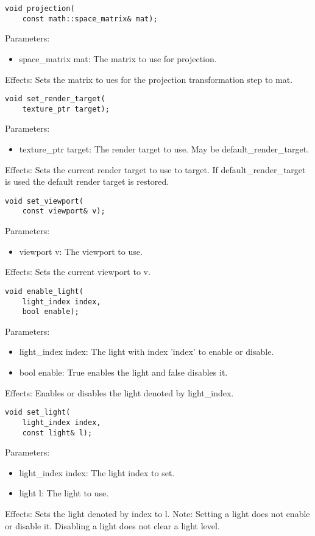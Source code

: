 \documentclass{article}
\begin{document}
\begin{lstlisting}
void projection(
	const math::space_matrix& mat);
\end{lstlisting}
Parameters:
\begin{itemize}
\item space\_matrix mat: The matrix to use for projection.
\end{itemize}
Effects: Sets the matrix to ues for the projection transformation step to mat.

\begin{lstlisting}
void set_render_target(
	texture_ptr target);
\end{lstlisting}
Parameters:
\begin{itemize}
\item texture\_ptr target: The render target to use. May be default\_render\_target.
\end{itemize}
Effects: Sets the current render target to use to target. If default\_render\_target is used the default render target is restored.

\begin{lstlisting}
void set_viewport(
	const viewport& v);
\end{lstlisting}
Parameters:
\begin{itemize}
\item viewport v: The viewport to use.
\end{itemize}
Effects: Sets the current viewport to v.

\begin{lstlisting}
void enable_light(
	light_index index,
	bool enable);
\end{lstlisting}
Parameters:
\begin{itemize}
\item light\_index index: The light with index 'index' to enable or disable.
\item bool enable: True enables the light and false disables it.
\end{itemize}
Effects: Enables or disables the light denoted by light\_index.

\begin{lstlisting}	
void set_light(
	light_index index,
	const light& l);
\end{lstlisting}
Parameters:
\begin{itemize}
\item light\_index index: The light index to set.
\item light l: The light to use.
\end{itemize}
Effects: Sets the light denoted by index to l.
Note: Setting a light does not enable or disable it. Disabling a light does not clear a light level.
\end{document}
